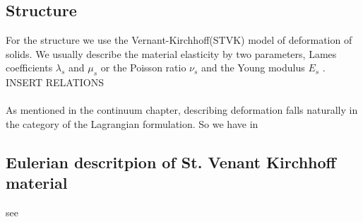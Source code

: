 \subsection{Structure}
For the structure we use the Vernant-Kirchhoff(STVK) model of deformation of solids. We usually describe the material elasticity by two parameters, Lames coefficients $\lambda_s$ and $\mu_s$ or the Poisson ratio $\nu_s$
and the Young modulus $E_s$ \cite{Dunne2006a}. INSERT RELATIONS \\ \\

As mentioned in the continuum chapter, describing deformation falls naturally in the category of the Lagrangian formulation. So we have in 

\subsection{Eulerian descritpion of St. Venant Kirchhoff material}
see \cite{Richter2013}

